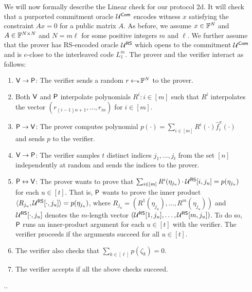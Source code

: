 We will now formally describe the Linear check for our protocol \name2d{}. It will check that a purported commitment oracle
$\mathcal{U}^{\mathsf{Com}}$ encodes witness $x$ satisfying the constraint $Ax=0$ for a public
matrix $A$. As before, we assume $x\in \mathbb{F}^N$ and $A\in \mathbb{F}^{N\times N}$ and
$N=m\ell$ for some positive integers $m$ and $\ell$. We further assume that
the prover has RS-encoded oracle $\mathcal{U}^{\mathsf{RS}}$ which opens to the commitment
$\mathcal{U}^{\mathsf{Com}}$ and is $e$-close to the interleaved code $L_1^{m}$. 
The prover and the verifier interact as follows:
\begin{enumerate}[{\rm 1.}]
\item $\mathsf{V}\rightarrow\mathsf{P}$: The verifier sends a random $r\hskip2.3pt{\gets\!\!\mbox{\tiny${\$}$\normalsize}}\,
\mathbb{F}^N$ to the prover.

\item Both $\mathsf{V}$ and $\mathsf{P}$ interpolate polynomials $R^i:i\in [m]$ such that $R^i$ interpolates the
vector $(r_{(i-1)n+1},\ldots,r_{in})$ for $i\in [m]$. 

\item $\mathsf{P}\rightarrow\mathsf{V}$: The prover computes polynomial 
$p(\cdot)=\sum_{i\in [m]}R^i(\cdot)\hat{f}^x_{i}(\cdot)$ and sends $p$ to the verifier.

\item $\mathsf{V}\rightarrow\mathsf{P}$: The verifier samples $t$ distinct indices
$j_1,\ldots,j_t$ from the set $[n]$ independently at random and sends the indices to the prover.

\item $\mathsf{P}\leftrightarrow\mathsf{V}$: The prover wants to prove that 
$\sum_{i\in [m]} R^i(\eta_{j_u}) \cdot \mathcal{U}^{\mathsf{RS}}[i, j_u] = p(\eta_{j_u})$ for each $u \in [t]$.
That is, $\mathsf{P}$ wants to prove the inner product $\langle R_{j_u},\mathcal{U}^{\mathsf{RS}}[\cdot,j_u]\rangle = p(\eta_{j_u})$,
where $R_{j_u} = (R^1(\eta_{j_u}), \ldots, R^m(\eta_{j_u}))$ and 
$\mathcal{U}^{\mathsf{RS}}[\cdot, j_u]$ denotes the $m$-length vector $(\mathcal{U}^{\mathsf{RS}}[1, j_u], \ldots, \mathcal{U}^{\mathsf{RS}}[m, j_u])$.
To do so, $\mathsf{P}$ runs an inner-product argument for each $u \in [t]$ with the verifier. The verifier proceeds if the arguments succeed for all $u \in [t]$.

\item The verifier also checks that $\sum_{k\in [\ell]}p(\zeta_k)=0$.
\item The verifier accepts if all the above checks succeed.
\end{enumerate}
..


